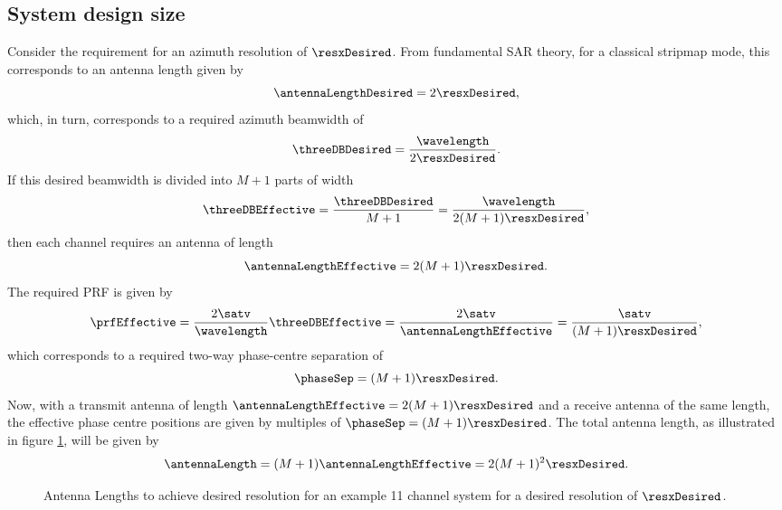 \subsection{System design size}
Consider the requirement for an azimuth resolution of $\resxDesired$. From fundamental SAR theory, for a classical stripmap mode, this corresponds to an antenna length given by
\begin{equation}
 \antennaLengthDesired = 2\resxDesired,
\end{equation}
which, in turn, corresponds to a required azimuth beamwidth of
\begin{equation}
 \threeDBDesired = \frac{\wavelength}{2\resxDesired}.
\end{equation}
If this desired beamwidth is divided into $M+1$ parts of width
\begin{equation}
 \threeDBEffective = \frac{\threeDBDesired}{M+1}=\frac{\wavelength}{2(M+1)\resxDesired},
\end{equation}
then each channel requires an antenna of length
\begin{equation}
 \antennaLengthEffective = 2(M+1)\resxDesired.
\end{equation}
The required PRF is given by
\begin{equation}
 \prfEffective = \frac{2\satv}{\wavelength}\threeDBEffective = \frac{2\satv}{\antennaLengthEffective} = \frac{\satv}{(M+1)\resxDesired},
 \label{eq:requiredPRF}
\end{equation}
which corresponds to a required two-way phase-centre separation of
\begin{equation}
 \phaseSep = (M+1)\resxDesired.
\end{equation}
Now, with a transmit antenna of length $\antennaLengthEffective = 2(M+1)\resxDesired$ and a receive antenna of the same length, the effective phase centre positions are given by  multiples of $\phaseSep = (M+1)\resxDesired$. The total antenna length, as illustrated in figure \ref{fg:antennaLenghts}, will be given by
\begin{equation}
 \antennaLength = (M+1)\antennaLengthEffective = 2(M+1)^2\resxDesired.
\end{equation}
\begin{figure}[h!]
\begin{center}
 \resizebox{0.8\columnwidth}{!}{}
 \caption{Antenna Lengths to achieve desired resolution for an example 11 channel system for a desired resolution of $\resxDesired$.}
 \label{fg:antennaLenghts}
 \end{center}
\end{figure}
